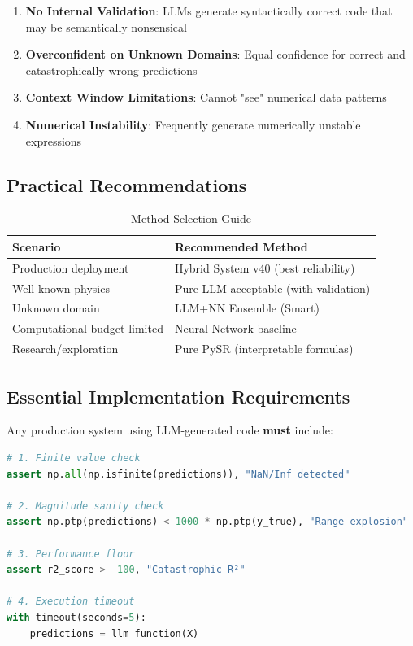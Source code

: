 \documentclass[11pt,a4paper]{article}
\begin{document}
\begin{enumerate}
    \item \textbf{No Internal Validation}: LLMs generate syntactically correct code that may be semantically nonsensical
    \item \textbf{Overconfident on Unknown Domains}: Equal confidence for correct and catastrophically wrong predictions
    \item \textbf{Context Window Limitations}: Cannot "see" numerical data patterns
    \item \textbf{Numerical Instability}: Frequently generate numerically unstable expressions
\end{enumerate}

\subsection{Practical Recommendations}

\begin{table}[h]
\centering
\caption{Method Selection Guide}
\begin{tabular}{lp{8cm}}
\toprule
\textbf{Scenario} & \textbf{Recommended Method} \\
\midrule
Production deployment & Hybrid System v40 (best reliability) \\
Well-known physics & Pure LLM acceptable (with validation) \\
Unknown domain & LLM+NN Ensemble (Smart) \\
Computational budget limited & Neural Network baseline \\
Research/exploration & Pure PySR (interpretable formulas) \\
\bottomrule
\end{tabular}
\end{table}

\subsection{Essential Implementation Requirements}

Any production system using LLM-generated code \textbf{must} include:

\begin{lstlisting}[language=Python, caption=Mandatory Validation Checks]
# 1. Finite value check
assert np.all(np.isfinite(predictions)), "NaN/Inf detected"

# 2. Magnitude sanity check
assert np.ptp(predictions) < 1000 * np.ptp(y_true), "Range explosion"

# 3. Performance floor
assert r2_score > -100, "Catastrophic R²"

# 4. Execution timeout
with timeout(seconds=5):
    predictions = llm_function(X)
\end{lstlisting}
\end{document}
